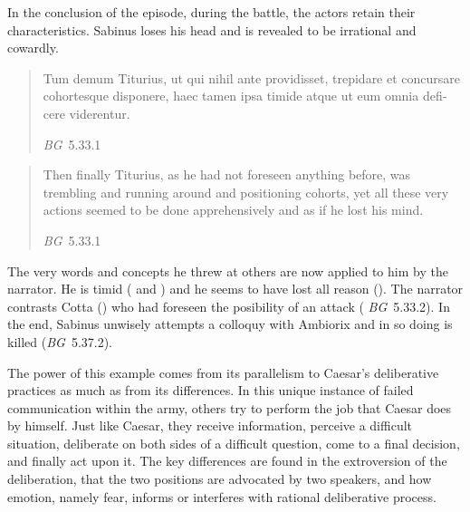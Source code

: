 \documentclass[12pt,letterpaper,oneside,final]{memoir}
\begin{document}
In the conclusion of the episode, during the battle, the actors retain their characteristics. Sabinus loses his head and is revealed to be irrational and cowardly. \blockquote[\emph{BG}~5.33.1]{\textlatin{Tum demum Titurius, ut qui nihil ante providisset, trepidare et concursare cohortesque disponere, haec tamen ipsa timide atque ut eum omnia deficere viderentur.}} \blockquote[\emph{BG}~5.33.1]{Then finally Titurius, as he had not foreseen anything before, was trembling and running around and positioning cohorts, yet all these very actions seemed to be done apprehensively and as if he lost his mind.} The very words and concepts he threw at others are now applied to him by the narrator. He is timid ( and ) and he seems to have lost all reason (). The narrator contrasts Cotta () who had foreseen the posibility of an attack ( \emph{BG}~5.33.2). In the end, Sabinus unwisely attempts a colloquy with Ambiorix and in so doing is killed (\emph{BG}~5.37.2).

The power of this example comes from its parallelism to Caesar's deliberative practices as much as from its differences. In this unique instance of failed communication within the army, others try to perform the job that Caesar does by himself. Just like Caesar, they receive information, perceive a difficult situation, deliberate on both sides of a difficult question, come to a final decision, and finally act upon it. The key differences are found in the extroversion of the deliberation, that the two positions are advocated by two speakers, and how emotion, namely fear, informs or interferes with rational deliberative process.
\end{document}
